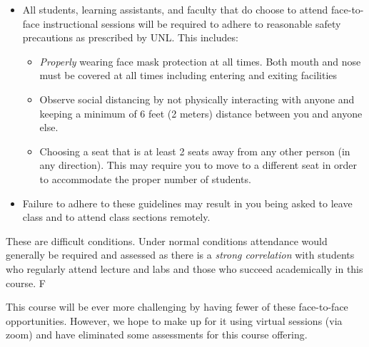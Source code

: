 \documentclass[12pt]{scrartcl}
\begin{document}
\begin{itemize}
  \item All students, learning assistants, and faculty that do choose
  to attend face-to-face instructional sessions will be required to adhere to
  reasonable safety precautions as prescribed by UNL.  This includes:
  \begin{itemize}
    \item \emph{Properly} wearing face mask protection at all
    times.  Both mouth and nose must be covered at all times 
    including entering and exiting facilities
    \item Observe social distancing by not physically interacting with
    anyone and keeping a minimum of 6 feet (2 meters) distance between
    you and anyone else.  
    \item Choosing a seat that is at least
    2 seats away from any other person (in any direction).  This
    may require you to move to a different seat in order to accommodate
    the proper number of students.
  \end{itemize}
  \item Failure to adhere to these guidelines may result in you 
  being asked to leave class and to attend class sections remotely.
\end{itemize}

These are difficult conditions.  Under normal conditions attendance
would generally be required and assessed as there is a 
\emph{strong correlation} with students who regularly 
attend lecture and labs and those who succeed academically
in this course.  F

This course will be ever more challenging by having fewer of these
face-to-face opportunities.  However, we hope to make up for it using
virtual sessions (via zoom) and have eliminated some assessments
for this course offering.  


%
\end{document}

